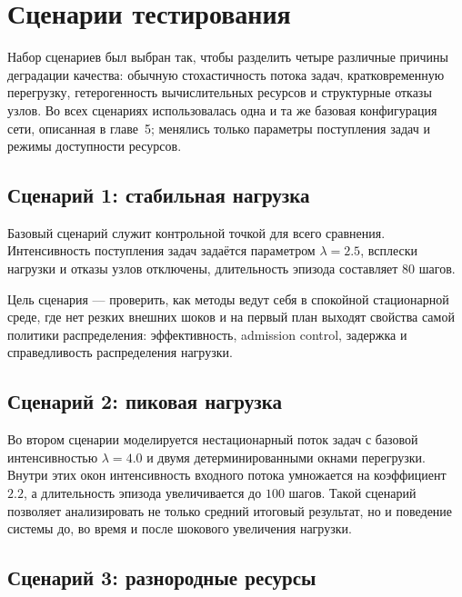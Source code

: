 \section{Сценарии тестирования}\label{sec:scenarios}

Набор сценариев был выбран так, чтобы разделить четыре различные причины
деградации качества: обычную стохастичность потока задач, кратковременную
перегрузку, гетерогенность вычислительных ресурсов и структурные отказы
узлов. Во всех сценариях использовалась одна и та же базовая конфигурация
сети, описанная в главе~5; менялись только параметры поступления задач и
режимы доступности ресурсов.

\subsection{Сценарий 1: стабильная нагрузка}

Базовый сценарий служит контрольной точкой для всего сравнения. Интенсивность
поступления задач задаётся параметром $\lambda = 2.5$, всплески нагрузки и
отказы узлов отключены, длительность эпизода составляет $80$ шагов.

Цель сценария --- проверить, как методы ведут себя в спокойной стационарной
среде, где нет резких внешних шоков и на первый план выходят свойства самой
политики распределения: эффективность, admission control, задержка и
справедливость распределения нагрузки.

\subsection{Сценарий 2: пиковая нагрузка}

Во втором сценарии моделируется нестационарный поток задач с базовой
интенсивностью $\lambda = 4.0$ и двумя детерминированными окнами перегрузки.
Внутри этих окон интенсивность входного потока умножается на коэффициент
$2.2$, а длительность эпизода увеличивается до $100$ шагов. Такой сценарий
позволяет анализировать не только средний итоговый результат, но и
поведение системы до, во время и после шокового увеличения нагрузки.

\begin{table}[htbp]
	\centering
	\caption{Интервалы всплесков нагрузки в сценарии 2}
	\label{tab:load-spikes-windows}
	\resizebox{\textwidth}{!}{}
\end{table}

\subsection{Сценарий 3: разнородные ресурсы}


